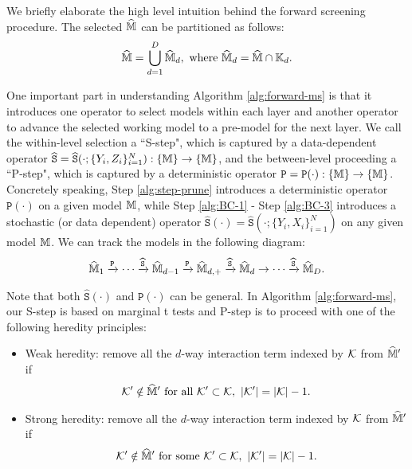\documentclass[12pt]{article}
\begin{document}
We briefly elaborate the high level intuition behind the forward screening procedure.  The selected $\widehat{{\mathbb{M}}}$ can be partitioned as follows:
\begin{align*}
    \widehat{{\mathbb{M}}} = \bigcup_{d=1}^D\widehat{{\mathbb{M}}}_d, \text{ where } \widehat{{\mathbb{M}}}_d = \widehat{{\mathbb{M}}}\cap {\mathbb{K}}_d.
\end{align*}

One important part in understanding Algorithm \ref{alg:forward-ms} is that it introduces one operator to select models within each layer and another operator to advance the selected working model to a pre-model for the next layer. We call the within-level selection a ``S-step", which is captured by a data-dependent operator $\widehat{\texttt{S}} = \widehat{\texttt{S}}(\cdot;\{Y_i,Z_i\}_{i=1}^N): \{{\mathbb{M}}\} \to \{{\mathbb{M}}\}$, and the between-level proceeding a ``P-step", which is captured by a deterministic operator $\texttt{P} = \texttt{P}(\cdot): \{{\mathbb{M}}\} \to \{{\mathbb{M}}\}$.  
Concretely speaking, Step \ref{alg:step-prune} introduces a deterministic operator $\texttt{P}(\cdot)$ on a given model ${\mathbb{M}}$, while Step \ref{alg:BC-1} - Step \ref{alg:BC-3} introduces a stochastic (or data dependent) operator $\hat{\texttt{S}}(\cdot) = \hat{\texttt{S}}(\cdot; \{Y_i,X_i\}_{i=1}^N)$ on any given model ${\mathbb{M}}$. We can track the models in the following diagram:
\begin{align}\label{eqn:track-model}
    \widehat{{\mathbb{M}}}_{1}\xrightarrow{\texttt{P}}\cdots\xrightarrow{ \widehat{\texttt{S}}}\widehat{{\mathbb{M}}}_{d-1}\xrightarrow{\texttt{P}}\widehat{{\mathbb{M}}}_{d,+}\xrightarrow{ \widehat{\texttt{S}}}\widehat{{\mathbb{M}}}_{d}\to \cdots \xrightarrow{ \widehat{\texttt{S}}} \widehat{{\mathbb{M}}}_{D}.
\end{align}

 Note that both $\hat{\texttt{S}}(\cdot)$ and $\texttt{P}(\cdot)$ can be general. In Algorithm \ref{alg:forward-ms}, our S-step is based on marginal t tests and P-step is to proceed with one of the following heredity principles:
\begin{itemize}
\item Weak heredity: remove all the $d$-way interaction term indexed by ${\mathcal{K}}$ from $\widehat{{\mathbb{M}}}'$ if 
       \begin{align}
           {\mathcal{K}}'\notin \widehat{{\mathbb{M}}}' \text{ for all }{\mathcal{K}}'\subset{\mathcal{K}},~|{\mathcal{K}}'| = |{\mathcal{K}}| - 1. \label{eqn:weak-heredity}
       \end{align}

\item Strong heredity: remove all the $d$-way interaction term indexed by ${\mathcal{K}}$ from $\widehat{{\mathbb{M}}}'$ if 
       \begin{align}
           {\mathcal{K}}'\notin \widehat{{\mathbb{M}}}' \text{ for some }{\mathcal{K}}'\subset{\mathcal{K}},~|{\mathcal{K}}'| = |{\mathcal{K}}| - 1. \label{eqn:strong-heredity}
       \end{align}

\end{itemize}
\end{document}
